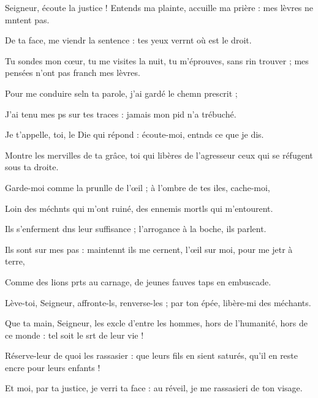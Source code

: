 \item Seigneur, écoute la justice !\pscross{} Entends ma plainte, accuille ma prière :\psstar{} mes lèvres ne mntent pas.
\item De ta face, me viendr la sentence :\psstar{} tes yeux verrnt où est le droit.
\item Tu sondes mon cœur, tu me visites la nuit,\pscross{} tu m’éprouves, sans rin trouver ;\psstar{} mes pensées n’ont pas franch mes lèvres.
\item Pour me conduire seln ta parole,\psstar{} j’ai gardé le chemn prescrit ;
\item J’ai tenu mes ps sur tes traces :\psstar{} jamais mon pid n’a trébuché.
\item Je t’appelle, toi, le Die qui répond :\psstar{} écoute-moi, entnds ce que je dis.
\item Montre les mervilles de ta grâce,\psstar{} toi qui libères de l’agresseur ceux qui se réfugent sous ta droite.
\item Garde-moi comme la prunlle de l’œil ;\psstar{} à l’ombre de tes iles, cache-moi,
\item Loin des méchnts qui m’ont ruiné,\psstar{} des ennemis mortls qui m’entourent.
\item Ils s’enferment dns leur suffisance ;\psstar{} l’arrogance à la boche, ils parlent.
\item Ils sont sur mes pas : maintennt ils me cernent,\psstar{} l’œil sur moi, pour me jetr à terre,
\item Comme des lions prts au carnage,\psstar{} de jeunes fauves taps en embuscade.
\item Lève-toi, Seigneur, affronte-ls, renverse-les ;\psstar{} par ton épée, libère-mi des méchants.
\item Que ta main, Seigneur, les excle d’entre les hommes,\psstar{} hors de l’humanité, hors de ce monde : tel soit le srt de leur vie !
\item Réserve-leur de quoi les rassasier :\pscross{} que leurs fils en sient saturés,\psstar{} qu’il en reste encre pour leurs enfants !
\item Et moi, par ta justice, je verri ta face :\psstar{} au réveil, je me rassasieri de ton visage.